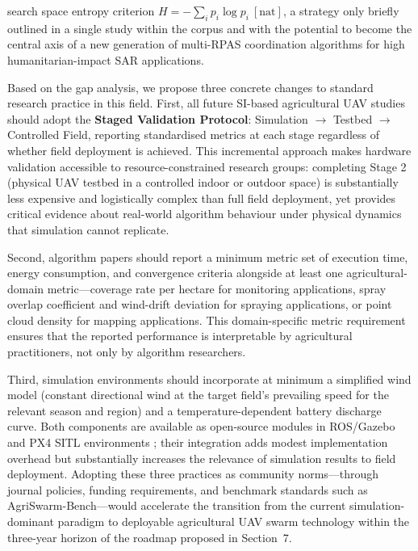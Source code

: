 \documentclass[review,3p,times]{elsarticle}
\begin{document}
search space entropy criterion $H = -\sum_i p_i \log p_i\ [\text{nat}]$, a strategy only briefly outlined in a single study within the corpus \cite{wang2023} and with the potential to become the central axis of a new generation of multi-RPAS coordination algorithms for high humanitarian-impact SAR applications.

Based on the gap analysis, we propose three concrete changes to standard research practice in this field. First, all future SI-based agricultural UAV studies should adopt the \textbf{Staged Validation Protocol}: Simulation $\rightarrow$ Testbed $\rightarrow$ Controlled Field, reporting standardised metrics at each stage regardless of whether field deployment is achieved. This incremental approach makes hardware validation accessible to resource-constrained research groups: completing Stage 2 (physical UAV testbed in a controlled indoor or outdoor space) is substantially less expensive and logistically complex than full field deployment, yet provides critical evidence about real-world algorithm behaviour under physical dynamics that simulation cannot replicate.

Second, algorithm papers should report a minimum metric set of execution time, energy consumption, and convergence criteria alongside at least one agricultural-domain metric---coverage rate per hectare for monitoring applications, spray overlap coefficient and wind-drift deviation for spraying applications, or point cloud density for mapping applications. This domain-specific metric requirement ensures that the reported performance is interpretable by agricultural practitioners, not only by algorithm researchers.

Third, simulation environments should incorporate at minimum a simplified wind model (constant directional wind at the target field's prevailing speed for the relevant season and region) and a temperature-dependent battery discharge curve. Both components are available as open-source modules in ROS/Gazebo and PX4 SITL environments \cite{shafiq2022}; their integration adds modest implementation overhead but substantially increases the relevance of simulation results to field deployment. Adopting these three practices as community norms---through journal policies, funding requirements, and benchmark standards such as AgriSwarm-Bench---would accelerate the transition from the current simulation-dominant paradigm to deployable agricultural UAV swarm technology within the three-year horizon of the roadmap proposed in Section~7.
\end{document}
